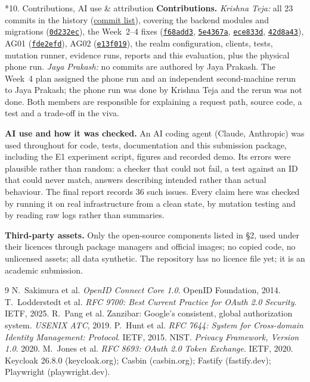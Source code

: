 \documentclass[11pt]{article}
\makeatletter
\newcommand{\JayaContribution}{}
\newcommand{\repo}{https://github.com/krishnateja2314/iam-provider}
\newcommand{\commit}[1]{\href{\repo/commit/#1}{\texttt{#1}}}
\renewcommand\section{\@startsection{section}{1}{0pt}{-10pt plus -2pt}{4pt}{\large\bfseries}}
\makeatother
\begin{document}
\section*{10. Contributions, AI use \& attribution}
\textbf{Contributions.} \emph{Krishna Teja:} all 23 commits in the history (\href{\repo/commits/cs5903-final-2026}{commit list}), covering the backend modules and migrations (\commit{0d232ec}), the Week~2--4 fixes (\commit{f68add3}, \commit{5e4367a}, \commit{ece833d}, \commit{42d8a43}), AG01 (\commit{fde2efd}), AG02 (\commit{e13f019}), the realm configuration, clients, tests, mutation runner, evidence runs, reports and this evaluation, plus the physical phone run. \emph{Jaya Prakash:} no commits are authored by Jaya Prakash. The Week~4 plan assigned the phone run and an independent second-machine rerun to Jaya Prakash; the phone run was done by Krishna Teja and the rerun was not done. \JayaContribution{} Both members are responsible for explaining a request path, source code, a test and a trade-off in the viva.

\textbf{AI use and how it was checked.} An AI coding agent (Claude, Anthropic) was used throughout for code, tests, documentation and this submission package, including the E1 experiment script, figures and recorded demo. Its errors were plausible rather than random: a checker that could not fail, a test against an ID that could never match, answers describing intended rather than actual behaviour. The final report records 36 such issues. Every claim here was checked by running it on real infrastructure from a clean state, by mutation testing and by reading raw logs rather than summaries.

\textbf{Third-party assets.} Only the open-source components listed in \S2, used under their licences through package managers and official images; no copied code, no unlicensed assets; all data synthetic. The repository has no licence file yet; it is an academic submission.

\begin{thebibliography}{9}\small
\setlength{\itemsep}{0pt}
 N.~Sakimura et al. \emph{OpenID Connect Core 1.0}. OpenID Foundation, 2014.
 T.~Lodderstedt et al. \emph{RFC 9700: Best Current Practice for OAuth 2.0 Security}. IETF, 2025.
 R.~Pang et al. Zanzibar: Google's consistent, global authorization system. \emph{USENIX ATC}, 2019.
 P.~Hunt et al. \emph{RFC 7644: System for Cross-domain Identity Management: Protocol}. IETF, 2015.
 NIST. \emph{Privacy Framework, Version 1.0}. 2020.
 M.~Jones et al. \emph{RFC 8693: OAuth 2.0 Token Exchange}. IETF, 2020.
 Keycloak 26.8.0 (keycloak.org); Casbin (casbin.org); Fastify (fastify.dev); Playwright (playwright.dev).
\end{thebibliography}
\end{document}
